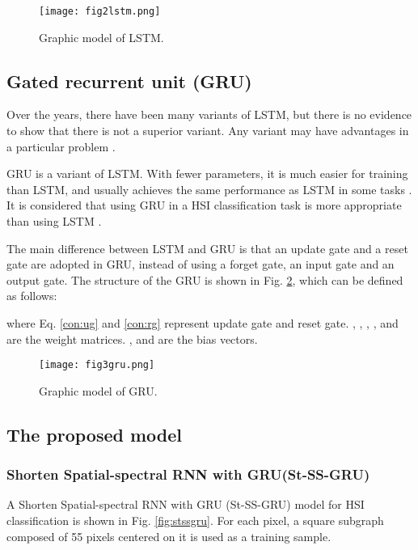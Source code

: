 \documentclass[conference]{IEEEtran}
\begin{document}
\begin{figure}[htbp]
    \centerline{\texttt{[image: fig2lstm.png]}}
    \caption{Graphic model of LSTM.}
    \label{fig:lstm}
\end{figure}

\subsection{Gated recurrent unit (GRU)}

Over the years, there have been many variants of LSTM, but there is no evidence to show
that there is not a superior variant. Any variant may have advantages in a particular
problem \cite{greff2017lstm}.

GRU \cite{yao2015depth} is a variant of LSTM. With fewer parameters, it is much easier
for training than LSTM, and usually achieves the same performance as LSTM in some tasks
\cite{jozefowicz2015empirical}. It is considered that using GRU in a HSI classification
task is more appropriate than using LSTM \cite{mou2017deep}.

The main difference between LSTM and GRU is that an update gate and a reset gate are
adopted in GRU, instead of using a forget gate, an input gate and an output gate. The
structure of the GRU is shown in Fig. \ref{fig:gru}, which can be defined as follows:




where Eq. \eqref{con:ug} and \eqref{con:rg} represent update gate and reset gate.
, , , ,  and
 are the weight matrices. ,  and
 are the bias vectors.

\begin{figure}[htbp]
    \centerline{\texttt{[image: fig3gru.png]}}
    \caption{Graphic model of GRU.}
    \label{fig:gru}
\end{figure}

\subsection{The proposed model}

\subsubsection{Shorten Spatial-spectral RNN with GRU(St-SS-GRU)}

A Shorten Spatial-spectral RNN with GRU (St-SS-GRU) model for HSI classification is
shown in Fig. \ref{fig:stssgru}. For each pixel, a square subgraph composed of
55 pixels centered on it is used as a training sample.
\end{document}
